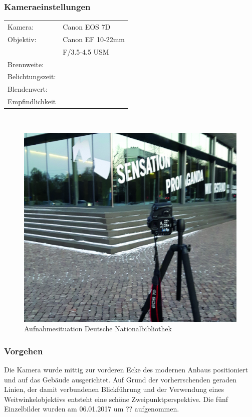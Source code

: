 \documentclass[liststotoc,bibtotoc,fontsize=14pt,]{scrreprt}
\begin{document}
	\subsubsection{Kameraeinstellungen}
	\begin{minipage}{0.58\textwidth}
		\begin{tabular}{ll}
			Kamera: &Canon EOS 7D \\
			Objektiv: &Canon EF 10-22mm \\
			& F/3.5-4.5 USM\\		
			Brennweite:&  \\
			Belichtungszeit: & \\
			Blendenwert: & \\
			Empfindlichkeit & \\
		\end{tabular}\\
	\end{minipage}%
	\begin{minipage}{0.42\textwidth}
		\begin{figure}[H]
			\includegraphics[width=\linewidth]{img/places/bibo.jpg}
			\caption{Aufnahmesituation Deutsche Nationalbibliothek}
			\label{img:ak}
		\end{figure}
	\end{minipage}%
			
	\subsubsection{Vorgehen}
	Die Kamera wurde mittig zur vorderen Ecke des modernen Anbaus positioniert und auf das Gebäude ausgerichtet. Auf Grund der vorherrschenden geraden Linien, der damit verbundenen Blickführung und der Verwendung eines Weitwinkelobjektivs entsteht eine schöne Zweipunktperspektive. Die fünf Einzelbilder wurden am 06.01.2017 um ?? aufgenommen. 
	
\end{document}
